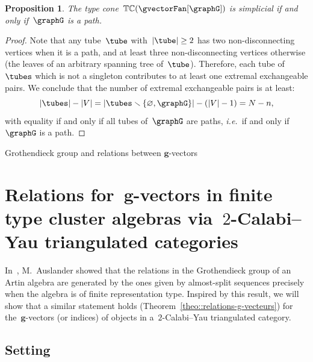 \documentclass{amsart}
\makeatletter
\newtheorem{proposition}[theorem]{Proposition}
\theoremstyle{definition}
\renewcommand{\b}[1]{{\boldsymbol{#1}}} %
\newcommand{\ssm}{\smallsetminus} %
\newcommand{\ie}{\textit{i.e.}~} %
\newcommand{\typeCone}{\mathbb{TC}} %
\def\part{\@startsection{part}{1}%
\z@{.7\linespacing\@plus\linespacing}{.8\linespacing}%
{\LARGE\sffamily\centering}}
\makeatother
\begin{document}
\begin{proposition}
The type cone~$\typeCone(\gvectorFan[\graphG])$ is simplicial if and only if~$\graphG$ is a path.
\end{proposition}

\begin{proof}
Note that any tube~$\tube$ with~$|\tube| \ge 2$ has two non-disconnecting vertices when it is a path, and at least three non-disconnecting vertices otherwise (the leaves of an arbitrary spanning tree of~$\tube$).
Therefore, each tube of~$\tubes$ which is not a singleton contributes to at least one extremal exchangeable pairs.
We conclude that the number of extremal exchangeable pairs is at least:
\[
|\tubes| - |V| = |\tubes \ssm \{\varnothing, \graphG\}| - (|V|-1) = N - n,
\]
with equality if and only if all tubes of~$\graphG$ are paths, \ie if and only if~$\graphG$ is a path.
\end{proof}



\newpage
\part{Grothendieck group and relations between $\b{g}$-vectors}
\label{part:algebra}


\section{Relations for~$\b{g}$-vectors in finite type cluster algebras via~$2$-Calabi--Yau triangulated categories}
\label{sec:clusterCategories}

In~\cite{Auslander1984}, M.~Auslander showed that the relations in the Grothendieck group of an Artin algebra are generated by the ones given by almost-split sequences precisely when the algebra is of finite representation type.  Inspired by this result, we will show that a similar statement holds (Theorem~\ref{theo::relations-g-vecteurs}) for the~$\b g$-vectors (or indices) of objects in a~$2$-Calabi--Yau triangulated category. 


\subsection{Setting}
\label{sect::setting}
\end{document}
